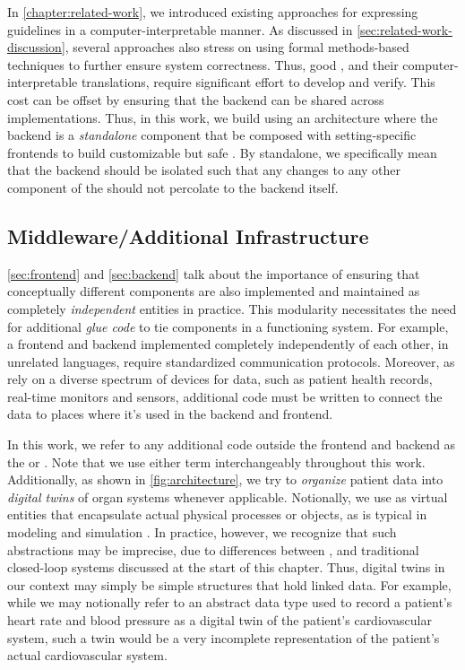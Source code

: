 In \autoref{chapter:related-work}, we introduced existing approaches
for expressing guidelines in a computer-interpretable manner.
As discussed in \autoref{sec:related-work-discussion}, several
approaches also stress on using formal methods-based techniques to further
ensure system correctness. Thus, good \BPGs{}, and
their computer-interpretable translations, require significant
effort to develop and verify. This cost can be
 offset by ensuring that the backend can be shared
across \CDSSs{} implementations. Thus, in this work, we
build \CDSSs{} using an architecture where the backend
is a \emph{standalone} component that be composed with
setting-specific frontends to build customizable but safe \CDSSs{}.
By standalone, we specifically mean that the backend should be isolated
such that any changes to any other  component of the \CDSSs{}
should not percolate to the backend itself.


\subsection{Middleware/Additional Infrastructure}\label{sec:middleware}

\autoref{sec:frontend} and \autoref{sec:backend} talk about
the importance of ensuring that conceptually different components are
also implemented and maintained as completely \emph{independent} entities
in practice. This modularity necessitates the need for additional
\emph{glue code} to tie components in a functioning system. For example,
a frontend and backend implemented completely independently of each
other, in unrelated languages, require standardized communication
protocols. Moreover, as \CDSSs{} rely on a diverse spectrum of devices for
data, such as patient health records, real-time monitors and sensors, additional
code must be written to connect the data to places where it's used in
the backend and frontend.

In this work, we refer to any additional code outside the frontend and
backend as the  or .
Note that we use either term interchangeably throughout this work.
Additionally, as shown in \autoref{fig:architecture},
we try to \emph{organize} patient
data into \emph{digital twins} of organ systems whenever applicable.
Notionally, we use  as virtual entities that encapsulate
actual physical processes or objects,
as is typical in modeling and simulation \cite{TaoJMS22}.
In practice, however, we recognize that such abstractions may be
imprecise, due to differences between \CDSSs{}, and traditional
closed-loop systems discussed at the start of this chapter. Thus,
digital twins in our context may simply be simple structures that
hold linked data. For example, while we may notionally refer to an abstract data type
used to record a patient's heart rate and blood pressure as a digital twin of
the patient's cardiovascular system, such a twin would be a very incomplete
representation of the patient's actual cardiovascular system.

